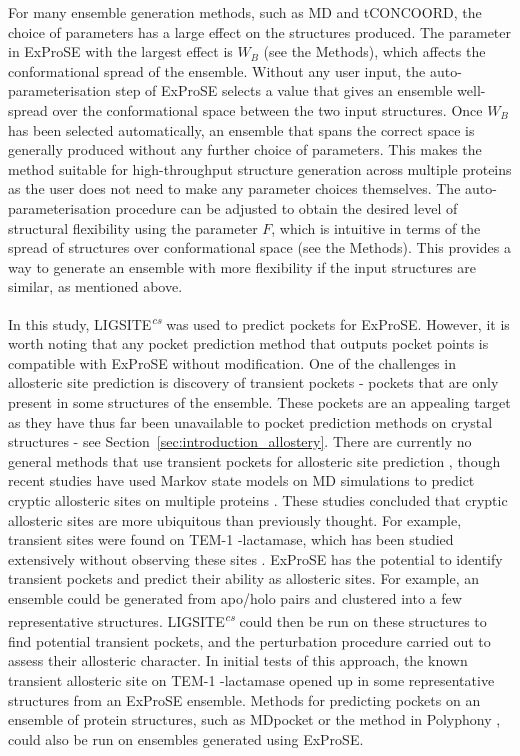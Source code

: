 For many ensemble generation methods, such as MD and tCONCOORD, the choice of parameters has a large effect on the structures produced.
The parameter in ExProSE with the largest effect is $W_{B}$ (see the Methods), which affects the conformational spread of the ensemble.
Without any user input, the auto-parameterisation step of ExProSE selects a value that gives an ensemble well-spread over the conformational space between the two input structures.
Once $W_{B}$ has been selected automatically, an ensemble that spans the correct space is generally produced without any further choice of parameters.
This makes the method suitable for high-throughput structure generation across multiple proteins as the user does not need to make any parameter choices themselves.
The auto-parameterisation procedure can be adjusted to obtain the desired level of structural flexibility using the parameter $F$, which is intuitive in terms of the spread of structures over conformational space (see the Methods).
This provides a way to generate an ensemble with more flexibility if the input structures are similar, as mentioned above.

In this study, LIGSITE\textsuperscript{\it cs} was used to predict pockets for ExProSE.
However, it is worth noting that any pocket prediction method that outputs pocket points is compatible with ExProSE without modification.
One of the challenges in allosteric site prediction is discovery of transient pockets - pockets that are only present in some structures of the ensemble.
These pockets are an appealing target as they have thus far been unavailable to pocket prediction methods on crystal structures - see Section~\ref{sec:introduction_allostery}.
There are currently no general methods that use transient pockets for allosteric site prediction \cite{Boehr2009}, though recent studies have used Markov state models on MD simulations to predict cryptic allosteric sites on multiple proteins \cite{Bowman2012, Bowman2015}.
These studies concluded that cryptic allosteric sites are more ubiquitous than previously thought.
For example, transient sites were found on TEM-1 \textbeta -lactamase, which has been studied extensively without observing these sites \cite{Bowman2015}.
ExProSE has the potential to identify transient pockets and predict their ability as allosteric sites.
For example, an ensemble could be generated from apo/holo pairs and clustered into a few representative structures.
LIGSITE\textsuperscript{\it cs} could then be run on these structures to find potential transient pockets, and the perturbation procedure carried out to assess their allosteric character.
In initial tests of this approach, the known transient allosteric site on TEM-1 \textbeta -lactamase opened up in some representative structures from an ExProSE ensemble.
Methods for predicting pockets on an ensemble of protein structures, such as MDpocket \cite{Schmidtke2011} or the method in Polyphony \cite{Pitt2014}, could also be run on ensembles generated using ExProSE.

